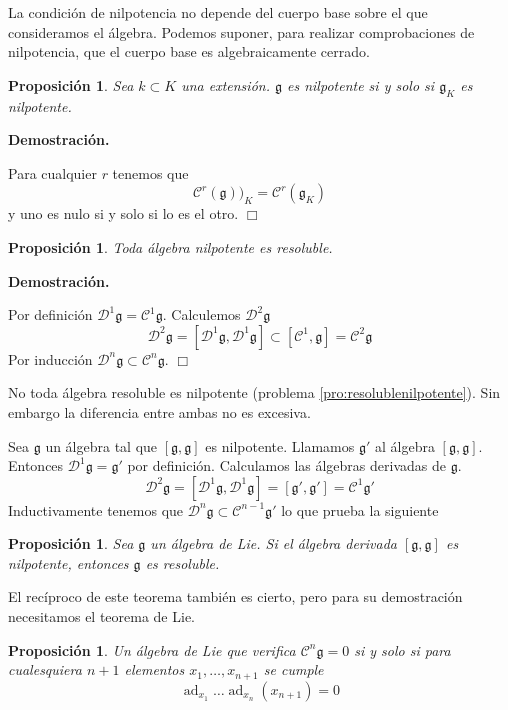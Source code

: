 \documentclass[a4paper,draft,12pt]{article}
\newtheorem{propo}[teo]{Proposición}%
\newcommand{\dem}{\noindent \textbf{Demostración. }\vspace{0.3 cm}}%
\newcommand{\g}{\mathfrak{g}}%
\newcommand{\fin}{ $\Box $ \vspace{0.4 cm}}
\newcommand{\D}{\mathcal{D}}%
\newcommand{\central}{\mathcal{C}}%
\DeclareMathOperator{\ad}{ad}  %
\begin{document}
La condición de nilpotencia no depende del cuerpo base sobre el que consideramos el álgebra.  Podemos suponer, para realizar comprobaciones de nilpotencia, que el cuerpo base es algebraicamente cerrado.

\begin{propo}

Sea $k \subset K$ una extensión. $\g$ es nilpotente si y solo si $\g_K$ es nilpotente.

\end{propo}

\dem

Para cualquier $r$ tenemos que
$$
\central^r(\g))_K= \central^r(\g_K)
$$
y uno es nulo si y solo si lo es el otro.  \fin



\begin{propo}

Toda álgebra nilpotente es resoluble.

\end{propo}

\dem

Por definición $\D^1\g= \central^1 \g$.  Calculemos $\D^2 \g$
$$
\D^2\g = [\D^1\g, \D^1\g] \subset [\central^1, \g] = \central^2 \g
$$
Por inducción $\D^n\g \subset \central^n \g$. \fin

No toda álgebra resoluble es nilpotente (problema \ref{pro:resolublenilpotente}). Sin embargo la  diferencia entre ambas no es excesiva.


Sea $\g$ un álgebra tal que $[\g,\g]$ es nilpotente.  Llamamos $\g'$ al álgebra $[\g,\g]$. Entonces $\D^1 \g= \g'$ por definición.  Calculamos las álgebras derivadas de $\g$.
$$
\D^2\g= [\D^1\g,\D^1\g]= [\g',\g']= \central^1\g'
$$
Inductivamente tenemos que $\D^n\g \subset \central^{n-1}\g'$ lo que prueba la siguiente 

\begin{propo}

Sea $\g$ un álgebra de Lie.  Si el álgebra derivada $[\g,\g]$ es nilpotente, entonces $\g$ es resoluble.

\end{propo}

El recíproco de este teorema también es cierto, pero para su demostración necesitamos el teorema de Lie.


\begin{propo}

Un álgebra de Lie que verifica $\central^n \g=0$ si y solo si para cualesquiera $n+1$ elementos $x_1, \dots , x_{n+1}$ se cumple
$$
\ad_{x_1}\dots\ad_{x_{n}}(x_{n+1})=0
$$

\end{propo}
\end{document}

